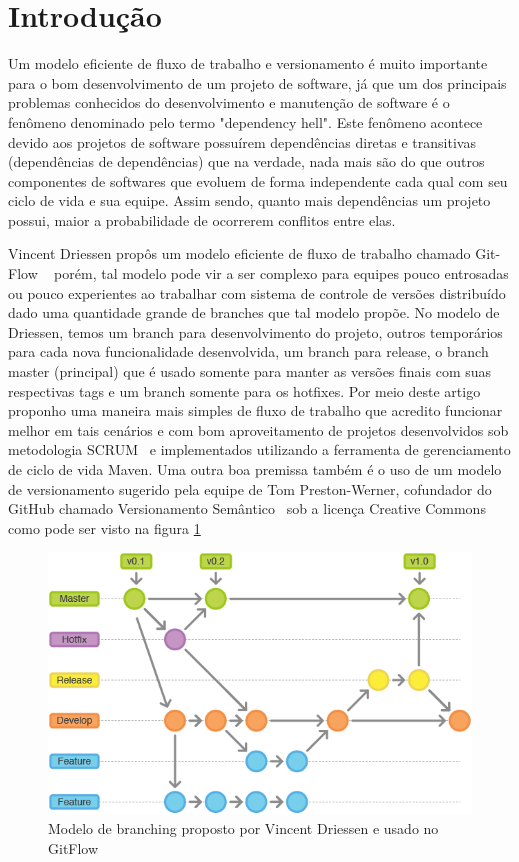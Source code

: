 \section{Introdução}
\label{sec:intro}
Um modelo eficiente de fluxo de trabalho e versionamento é muito importante para o bom desenvolvimento de um projeto de software, já que um dos principais problemas conhecidos do desenvolvimento e manutenção de software é o fenômeno denominado pelo termo "dependency hell". Este fenômeno acontece devido aos projetos de software possuírem dependências diretas e transitivas (dependências de dependências) que na verdade, nada mais são do que outros componentes de softwares que evoluem de forma independente cada qual com seu ciclo de vida e sua equipe. Assim sendo, quanto mais dependências um projeto possui, maior a probabilidade de ocorrerem conflitos entre elas.

Vincent Driessen propôs um modelo eficiente de fluxo de trabalho chamado Git-Flow ~\cite{gitflow} porém, tal modelo pode vir a ser complexo para equipes pouco entrosadas ou pouco experientes ao trabalhar com sistema de controle de versões distribuído dado uma quantidade grande de branches que tal modelo propõe. No modelo de Driessen, temos um branch para desenvolvimento do projeto, outros temporários para cada nova funcionalidade desenvolvida, um branch para release, o branch master (principal) que é usado somente para manter as versões finais com suas respectivas tags e um branch somente para os hotfixes.
Por meio deste artigo proponho uma maneira mais simples de fluxo de trabalho que acredito funcionar melhor em tais cenários e com bom aproveitamento de projetos desenvolvidos sob metodologia SCRUM~\cite{scrum} e implementados utilizando a ferramenta de gerenciamento de ciclo de vida Maven. Uma outra boa premissa também é o uso de um modelo de versionamento sugerido pela equipe de Tom Preston-Werner, cofundador do GitHub chamado Versionamento Semântico~\cite{semver} sob a licença Creative Commons como pode ser visto na figura \ref{fig:modelogitflow}

\begin{figure}[h!]
\centering
\includegraphics[width=0.7\linewidth]{img/modelo_gitflow}
\caption[Modelo de Branching GitFlow]{Modelo de branching proposto por Vincent Driessen e usado no GitFlow}
\label{fig:modelogitflow}
\end{figure}

